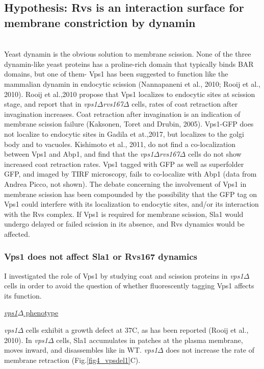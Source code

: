 \vspace{3mm}
\subsection{Hypothesis: Rvs is an interaction surface for membrane constriction by dynamin }
	\mbox{}\\
Yeast dynamin is the obvious solution to membrane scission. None of the three dynamin-like yeast proteins has a proline-rich domain that typically binds BAR domains, but one of them- Vps1 has been suggested to function like the mammalian dynamin in endocytic scission (Nannapaneni et al., 2010; Rooij et al., 2010). Rooij et al.,2010 propose that Vps1 localizes to endocytic sites at scission stage, and report that in \textit{vps1$\Delta$}\textit{rvs167$\Delta$} cells, rates of coat retraction after invagination increases. Coat retraction after invagination is an indication of membrane scission failure (Kaksonen, Toret and Drubin, 2005). Vps1-GFP does not localize to endocytic sites in Gadila et at.,2017, but localizes to the golgi body and to vacuoles. Kishimoto et al., 2011, do not find a co-localization between Vps1 and Abp1, and find that the \textit{vps1$\Delta$}\textit{rvs167$\Delta$} cells do not show increased coat retraction rates. Vps1 tagged with GFP as well as superfolder GFP, and imaged by TIRF microscopy, fails to co-localize with Abp1 (data from Andrea Picco, not shown). The debate concerning the involvement of Vps1 in membrane scission has been compounded by the possibility that the GFP tag on Vps1 could interfere with its localization to endocytic sites, and/or its interaction with the Rvs complex. If Vps1 is required for membrane scission, Sla1 would undergo delayed or failed scission in its absence, and Rvs dynamics would be affected. 



			\subsubsection{Vps1 does not affect Sla1 or Rvs167 dynamics }
I investigated the role of Vps1 by studying coat and scission proteins in \textit{vps1$\Delta$} cells in order to avoid the question of whether fluorescently tagging Vps1 affects its function. 
\vspace{5mm}

\underline{\textit{vps1$\Delta$} phenotype}

\textit{vps1$\Delta$} cells exhibit a growth defect at 37C, as has been reported (Rooij et al., 2010). In \textit{vps1$\Delta$} cells, Sla1 accumulates in patches at the plasma membrane, moves inward, and disassembles like in WT. \textit{vps1$\Delta$} does not increase the rate of membrane retraction  (Fig.\ref{fig4_vpsdel1}C). 

